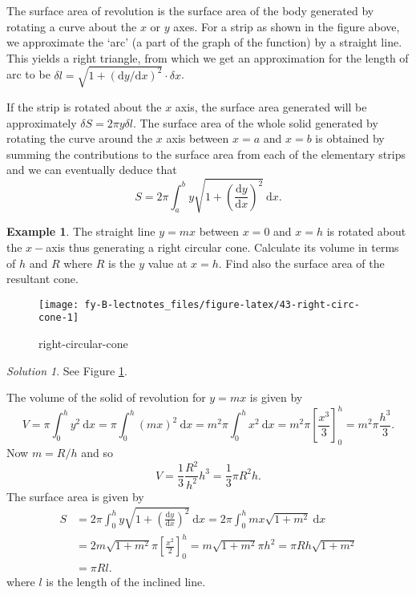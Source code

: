 \documentclass[
  11pt,
  oneside]{book}
\newcommand{\slide}{}
\theoremstyle{definition}
\theoremstyle{definition}
\newtheorem{example}{Example}[chapter]
\theoremstyle{definition}
\theoremstyle{definition}
\theoremstyle{remark}
\newtheorem*{solution}{Solution}
\begin{document}
The surface area of revolution is the surface area of the body generated by rotating a curve about the \(x\) or \(y\) axes. For a strip as shown in the figure above, we approximate the `arc' (a part of the graph of the function) by a straight line. This yields a right triangle, from which we get an approximation for the length of arc to be \(\delta l=\sqrt{1+(\mathrm{d}y/\mathrm{d}x)^2}\cdot\delta x\).

\slide

If the strip is rotated about the \(x\) axis, the surface area generated will be approximately \(\delta S = 2\pi y\delta l\). The surface area of the whole solid generated by rotating the curve around the \(x\) axis between \(x = a\) and \(x = b\) is obtained by summing the contributions to the surface area from each of the elementary strips and we can eventually deduce that
\[
S = 2\pi\int_a^b y\sqrt{1+\left(\frac{\mathrm{d}y}{\mathrm{d}x}\right)^2}\ \mathrm{d}x.
\]
\slide

\begin{example}
\leavevmode

The straight line \(y=mx\) between \(x=0\) and \(x=h\) is rotated about the \(x-\)axis thus generating a right circular cone. Calculate its volume in terms of \(h\) and \(R\) where \(R\) is the \(y\) value at \(x=h\). Find also the surface area of the resultant cone.

\begin{figure}

{\centering \texttt{[image: fy-B-lectnotes\_files/figure-latex/43-right-circ-cone-1]} 

}

\caption{right-circular-cone}\label{fig:43-right-circ-cone}
\end{figure}

\end{example}

\begin{solution}
See Figure \ref{fig:43-right-circ-cone}.

The volume of the solid of revolution for \(y = mx\) is given by
\[
V = \pi\int_0^hy^2\ \mathrm{d}x = \pi\int_0^h (mx)^2\ \mathrm{d}x = m^2\pi\int_0^hx^2\ \mathrm{d}x = m^2\pi\left[\frac{x^3}3\right]_0^h = m^2\pi\frac{h^3}3.
\]
Now \(m = R/h\) and so
\[
V = \frac13\frac{R^2}{h^2}h^3 = \frac13\pi R^2h.
\]
The surface area is given by
\begin{align*}
S&= 2\pi\int_0^hy\sqrt{1+\left(\frac{\mathrm{d}y}{\mathrm{d}x}\right)^2}\ \mathrm{d}x = 2\pi\int_0^h mx\sqrt{1+m^2}\ \mathrm{d}x\\
&= 2m\sqrt{1+m^2}\pi\left[\frac{x^2}2\right]_0^h = m\sqrt{1+m^2}\pi h^2 = \pi R h\sqrt{1+m^2}\\
&= \pi Rl.
\end{align*}
where \(l\) is the length of the inclined line.
\end{solution}
\end{document}
